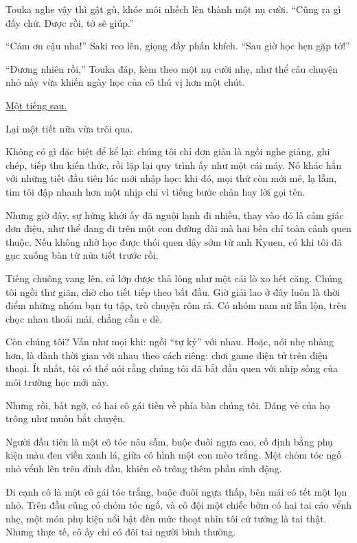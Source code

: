 \documentclass[../main.tex]{subfiles}
\begin{document}
Touka nghe vậy thì gật gù, khóe môi nhếch lên thành một nụ cười. ``Cũng ra gì đấy chứ. Được rồi, tớ sẽ giúp.''

``Cảm ơn cậu nha!'' Saki reo lên, giọng đầy phấn khích. ``Sau giờ học hẹn gặp tớ!''

``Đương nhiên rồi,'' Touka đáp, kèm theo một nụ cười nhẹ, như thể câu chuyện nhỏ này vừa khiến ngày học của cô thú vị hơn một chút.

\begin{center}
  \uline{Một tiếng sau.}
\end{center}

Lại một tiết nữa vừa trôi qua.

Không có gì đặc biệt để kể lại: chúng tôi chỉ đơn giản là ngồi nghe giảng, ghi chép, tiếp thu kiến thức, rồi lặp lại quy trình ấy như một cái máy. Nó khác hẳn với những tiết đầu tiên lúc mới nhập học: khi đó, mọi thứ còn mới mẻ, lạ lẫm, tim tôi đập nhanh hơn một nhịp chỉ vì tiếng bước chân hay lời gọi tên.

Nhưng giờ đây, sự hứng khởi ấy đã nguội lạnh đi nhiều, thay vào đó là cảm giác đơn điệu, như thể đang đi trên một con đường dài mà hai bên chỉ toàn cảnh quen thuộc. Nếu không nhờ học được thói quen dậy sớm từ anh Kyuen, có khi tôi đã gục xuống bàn từ nửa tiết trước rồi.

Tiếng chuông vang lên, cả lớp được thả lỏng như một cái lò xo hết căng. Chúng tôi ngồi thư giãn, chờ cho tiết tiếp theo bắt đầu. Giờ giải lao ở đây luôn là thời điểm những nhóm bạn tụ tập, trò chuyện rôm rả. Có nhóm nam nữ lẫn lộn, trêu chọc nhau thoải mái, chẳng cần e dè.


Còn chúng tôi? Vẫn như mọi khi: ngồi ``tự kỷ'' với nhau. Hoặc, nói nhẹ nhàng hơn, là dành thời gian với nhau theo cách riêng: chơi game điện tử trên điện thoại. Ít nhất, tôi có thể nói rằng chúng tôi đã bắt đầu quen với nhịp sống của môi trường học mới này.

Nhưng rồi, bất ngờ, có hai cô gái tiến về phía bàn chúng tôi. Dáng vẻ của họ trông như muốn bắt chuyện.

Người đầu tiên là một cô tóc nâu sẫm, buộc đuôi ngựa cao, cố định bằng phụ kiện màu đen viền xanh lá, giữa có hình một con mèo trắng. Một chỏm tóc ngố nhỏ vểnh lên trên đỉnh đầu, khiến cô trông thêm phần sinh động.

Đi cạnh cô là một cô gái tóc trắng, buộc đuôi ngựa thấp, bên mái có tết một lọn nhỏ. Trên đầu cũng có chỏm tóc ngố, và cô đội một chiếc bờm có hai tai cáo vểnh nhẹ, một món phụ kiện nổi bật đến mức thoạt nhìn tôi cứ tưởng là tai thật. Nhưng thực tế, cô ấy chỉ có đôi tai người bình thường.
\end{document}
